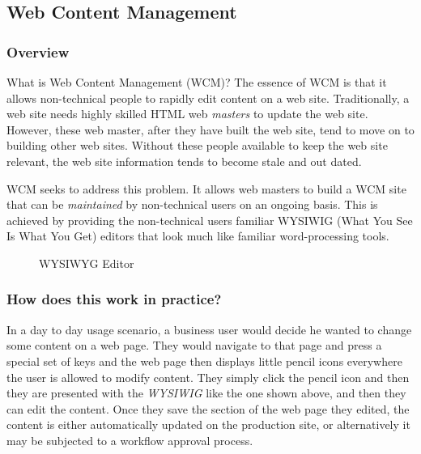 \subsection{Web Content Management}

\subsubsection{Overview}

What is Web Content Management (WCM)?  The essence of WCM is that it
allows non-technical people to rapidly edit content on a web site.
Traditionally, a web site needs highly skilled HTML web \emph{masters} to
update the web site.  However, these web master, after they have built
the web site, tend to move on to building other web sites.  Without
these people available to keep the web site relevant, the web site
information tends to become stale and out dated.
  
WCM seeks to address this problem.  It allows web masters to build a
WCM site that can be \emph{maintained} by non-technical users on an
ongoing basis.  This is achieved by providing the non-technical users
familiar WYSIWIG (What You See Is What You Get) editors that look much
like familiar word-processing tools.
  
\begin{figure}[h!]
  \centering
  \caption{WYSIWYG Editor}
\end{figure}

\subsubsection{How does this work in practice?}

In a day to day usage scenario, a business user would decide he wanted
to change some content on a web page.  They would navigate to that
page and press a special set of keys and the web page then displays
little pencil icons everywhere the user is allowed to modify content.
They simply click the pencil icon and then they are presented with the
\emph{WYSIWIG} like the one shown above, and then they can edit the
content.  Once they save the section of the web page they edited, the
content is either automatically updated on the production site, or
alternatively it may be subjected to a workflow approval process.
	
